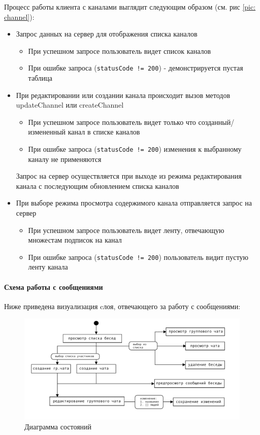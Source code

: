 \documentclass[a4paper,12pt]{article}
\begin{document}
	Процесс работы клиента с каналами выглядит следующим образом (см. рис \ref{pic: channel}):
	\begin{itemize}
		\item Запрос данных на сервер для отображения списка каналов
		\begin{itemize}
			\item При успешном запросе пользователь видет список каналов
			\item При ошибке запроса (\verb|statusCode != 200|) - демонстрируется пустая таблица
		\end{itemize}
		\item При редактировании или создании канала происходит вызов методов updateChannel или createChannel
		\begin{itemize}
			\item При успешном запросе пользователь видет только что созданный/измененный канал в списке каналов
			\item При ошибке запроса (\verb|statusCode != 200|) изменения к выбранному каналу не применяются
		\end{itemize}
		Запрос на сервер осуществляется при выходе из режима редактирования канала с последующим обновлением списка каналов
		\item При выборе режима просмотра содержимого канала отправляется запрос на сервер
		\begin{itemize}
			\item При успешном запросе пользователь видет ленту, отвечающую множестам подписок на канал
			\item При ошибке запроса (\verb|statusCode != 200|) пользователь видит пустую ленту канала
		\end{itemize}
	\end{itemize}
\clearpage
\paragraph{Схема работы с сообщениями\\}
Ниже приведена визуализация cлоя, отвечающего за работу с сообщениями:
\begin{figure}[h]
	\centering
	\includegraphics[width = 0.8\linewidth]{../includes/illustrations/Messages.pdf}
	\caption{Диаграмма состояний}
	\label{pic: messages}
\end{figure}
\end{document}
